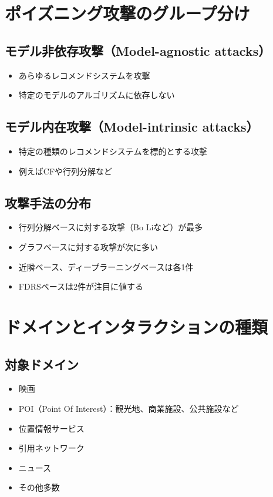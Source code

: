\documentclass[11pt,a4paper]{article}
\begin{document}
\section{ポイズニング攻撃のグループ分け}

\subsection{モデル非依存攻撃（Model-agnostic attacks）}
\begin{itemize}
    \item あらゆるレコメンドシステムを攻撃
    \item 特定のモデルのアルゴリズムに依存しない
\end{itemize}

\subsection{モデル内在攻撃（Model-intrinsic attacks）}
\begin{itemize}
    \item 特定の種類のレコメンドシステムを標的とする攻撃
    \item 例えばCFや行列分解など
\end{itemize}

\subsection{攻撃手法の分布}
\begin{itemize}
    \item 行列分解ベースに対する攻撃（Bo Liなど）が最多
    \item グラフベースに対する攻撃が次に多い
    \item 近隣ベース、ディープラーニングベースは各1件
    \item FDRSベースは2件が注目に値する
\end{itemize}

\section{ドメインとインタラクションの種類}

\subsection{対象ドメイン}
\begin{itemize}
    \item 映画
    \item POI（Point Of Interest）：観光地、商業施設、公共施設など
    \item 位置情報サービス
    \item 引用ネットワーク
    \item ニュース
    \item その他多数
\end{itemize}
\end{document}
